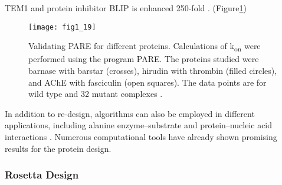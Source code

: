 \begin{refsection}
TEM1 and protein inhibitor BLIP is enhanced 250-fold \cite{Selzer2000}.
(Figure\ref{fig:tem1})
\begin{figure}[h!] \centering \texttt{[image: fig1\_19]}
    \caption[Validating PARE for different proteins. Calculations of
        k\textsubscript{on} were performed using the program PARE. The proteins
        studied were barnase with barstar (crosses), hirudin with thrombin
        (filled circles), and AChE with fasciculin (open squares). The data
        points are for wild type and 32 mutant complexes.]{Validating PARE for
            different proteins.  Calculations of k\textsubscript{on} were
            performed using the program PARE. The proteins studied were barnase
            with barstar (crosses), hirudin with thrombin (filled circles), and
            AChE with fasciculin (open squares). The data points are for wild
            type and 32 mutant complexes \cite{Selzer2000}.} 
            \label{fig:tem1} 
\end{figure}
In addition to re-design, algorithms can also be employed in different
applications, including alanine enzyme–substrate \cite{Bolon2001,Jiang2008} and
protein–nucleic acid interactions \cite{Ashworth2006}. Numerous computational
tools have already shown promising results for the protein design.

\subsubsection{Rosetta Design}


\end{refsection}
